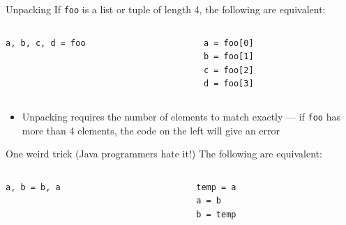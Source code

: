 \begin{frame}[fragile]{Unpacking}
	If \lstinline{foo} is a list or tuple of length 4, the following are equivalent:
	\pause
	\begin{columns}
		\begin{column}{0.48\textwidth}
			\begin{lstlisting}
a, b, c, d = foo
			\end{lstlisting}
		\end{column}
		\pause
		\begin{column}{0.48\textwidth}
			\begin{lstlisting}
a = foo[0]
b = foo[1]
c = foo[2]
d = foo[3]
			\end{lstlisting}
		\end{column}
	\end{columns}
	\begin{itemize}
		\pause\item Unpacking requires the number of elements to match exactly ---
			if \lstinline{foo} has more than 4 elements, the code on the left will give an error
	\end{itemize}
\end{frame}

\begin{frame}[fragile]{One weird trick (Java programmers hate it!)}
	The following are equivalent:
	\pause
	\begin{columns}
		\begin{column}{0.48\textwidth}
			\begin{lstlisting}
a, b = b, a
			\end{lstlisting}
		\end{column}
		\pause
		\begin{column}{0.48\textwidth}
			\begin{lstlisting}
temp = a
a = b
b = temp
			\end{lstlisting}
		\end{column}
	\end{columns}
\end{frame}

